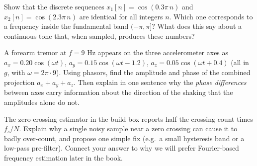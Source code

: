 \begin{exercise}
Show that the discrete sequences $x_1[n] = \cos(0.3\pi\, n)$ and $x_2[n] = \cos(2.3\pi\, n)$ are
identical for all integers $n$. Which one corresponds to a frequency inside the fundamental band
$(-\pi, \pi]$? What does this say about a continuous tone that, when sampled, produces these
numbers?
\end{exercise}

\begin{exercise}
A forearm tremor at $f = 9$ Hz appears on the three accelerometer axes as
$a_x = 0.20\cos(\omega t)$, $a_y = 0.15\cos(\omega t - 1.2)$, $a_z = 0.05\cos(\omega t + 0.4)$ (all
in $g$, with $\omega = 2\pi\cdot 9$). Using phasors, find the amplitude and phase of the combined
projection $a_x + a_y + a_z$. Then explain in one sentence why the \emph{phase differences} between
axes carry information about the direction of the shaking that the amplitudes alone do not.
\end{exercise}

\begin{exercise}
The zero-crossing estimator in the build box reports half the crossing count times $f_s/N$. Explain
why a single noisy sample near a zero crossing can cause it to badly over-count, and propose one
simple fix (e.g.\ a small hysteresis band or a low-pass pre-filter). Connect your answer to why we
will prefer Fourier-based frequency estimation later in the book.
\end{exercise}
